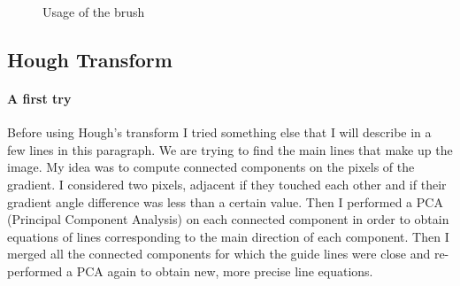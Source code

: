 \documentclass[11pt]{article}
\begin{document}
\begin{figure}[h]
		\vspace{-2mm}
		\caption{Usage of the brush}
		\label{im:brush}
	\end{figure}
	
	\subsection{Hough Transform}
	
	\paragraph{A first try}
	Before using Hough's transform I tried something else that I will describe in a few lines in this paragraph. We are trying to find the main lines that make up the image. My idea was to compute connected components on the pixels of the gradient. I considered two pixels, adjacent if they touched each other and if their gradient angle difference was less than a certain value. Then I performed a PCA (Principal Component Analysis) \cite{pca} on each connected component in order to obtain equations of lines corresponding to the main direction of each component. Then I merged all the connected components for which the guide lines were close and re-performed a PCA again to obtain new, more precise line equations.
	
\end{document}
